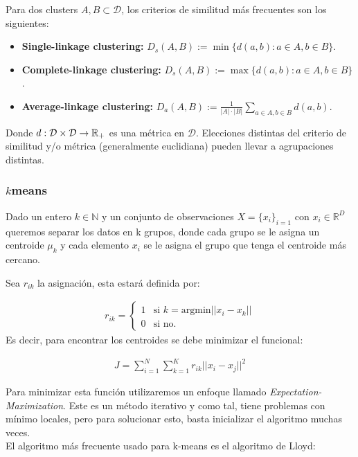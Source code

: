 Para dos clusters $A,B\subset\mathcal{D}$, los criterios de similitud más frecuentes son los siguientes:

\begin{itemize}
	\item \textbf{Single-linkage clustering:} $D_s(A,B):=\min\{d(a,b):a\in A, b\in B\}$.
	\item \textbf{Complete-linkage clustering:} $D_s(A,B):=\max\{d(a,b):a\in A, b\in B\}$.
	\item \textbf{Average-linkage clustering:} $D_a(A,B):=\frac{1}{|A|\cdot|B|}\sum_{a\in A, b\in B} d(a,b)$.
\end{itemize}

Donde $d:\mathcal{D}\times \mathcal{D}\to \mathbb{R}_+$ es una métrica en $\mathcal{D}$. Elecciones distintas del criterio de similitud y/o métrica (generalmente euclidiana) pueden llevar a agrupaciones distintas.

\subsubsection{\texorpdfstring{$k$}-means}
Dado un entero $k \in \mathbb{N}$ y un conjunto de observaciones $X = \{x_i\}_{i=1}$ con $x_i\in \mathbb{R}^D$ queremos separar los datos en k grupos, donde cada grupo se le asigna un centroide $\mu_k$ y cada elemento $x_i$ se le asigna el grupo que tenga el centroide más cercano.

Sea $r_{ik}$ la asignación, esta estará definida por:

\begin{align}
r_{ik} = \begin{cases}
1 & \text{si } k = \text{argmin}||x_i-x_k||\\
0 & \text{si no.}
\end{cases}
\end{align}
Es decir, para encontrar los centroides se debe minimizar el funcional:

\begin{align}
J = \sum_{i=1}^N \sum_{k=1}^K r_{ik} ||x_i-x_j||^2
\end{align}

Para minimizar esta función utilizaremos un enfoque llamado \emph{Expectation-Maximization}. Este es un método iterativo y como tal, tiene problemas con mínimo locales, pero para solucionar esto, basta inicializar el algoritmo muchas veces.\\

El algoritmo más frecuente usado para k-means es el algoritmo de Lloyd:

